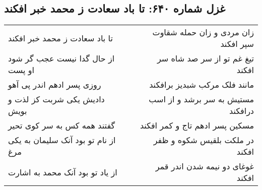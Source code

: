 \begin{center}
\section*{غزل شماره ۶۴۰: تا باد سعادت ز محمد خبر افکند}
\label{sec:0640}
\begin{longtable}{l p{0.5cm} r}
تا باد سعادت ز محمد خبر افکند
&&
زان مردی و زان حمله شقاوت سپر افکند
\\
از حال گدا نیست عجب گر شود او پست
&&
تیغ غم تو از سر صد شاه سر افکند
\\
روزی پسر ادهم اندر پی آهو
&&
مانند فلک مرکب شبدیز برافکند
\\
دادیش یکی شربت کز لذت و بویش
&&
مستیش به سر برشد و از اسب درافکند
\\
گفتند همه کس به سر کوی تحیر
&&
مسکین پسر ادهم تاج و کمر افکند
\\
از نام تو بود آنک سلیمان به یکی مرغ
&&
در ملکت بلقیس شکوه و ظفر افکند
\\
از یاد تو بود آنک محمد به اشارت
&&
غوغای دو نیمه شدن اندر قمر افکند
\\
\end{longtable}
\end{center}
